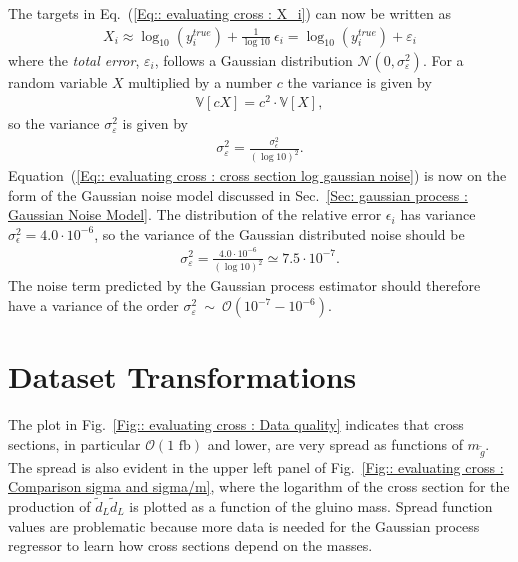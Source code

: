 \documentclass[twoside,english]{uiofysmaster}
\begin{document}
{{The targets in Eq.~(\ref{Eq:: evaluating cross : X_i}) can now be written as
\begin{align}\label{Eq:: evaluating cross : cross section log gaussian noise}
X_i \approx \log_{10}(y_i^{true}) + \frac{1}{\log 10} ~\epsilon_i = \log_{10}(y_i^{true}) + \varepsilon_i 
\end{align}
where the \textit{total error}, $\varepsilon_i$, follows a Gaussian distribution $\mathcal{N}(0, \sigma_{\varepsilon}^2)$. For a random variable $X$ multiplied by a number $c$ the variance is given by
\begin{align}
\mathbb{V}[c X] = c^2 \cdot \mathbb{V}[X],
\end{align}
so the variance $\sigma_{\varepsilon}^2$ is given by
\begin{align}
\sigma_{\varepsilon}^2 = \frac{\sigma_{\epsilon}^2}{(\log 10)^2}.
\end{align}
Equation~(\ref{Eq:: evaluating cross : cross section log gaussian noise}) is now on the form of the Gaussian noise model discussed in Sec.~\ref{Sec: gaussian process : Gaussian Noise Model}. The distribution of the relative error $\epsilon_i$ has variance $\sigma_{\epsilon}^2 = 4.0 \cdot 10^{-6}$, so the variance of the Gaussian distributed noise should be
\begin{align*}
\sigma_{\varepsilon}^2 =  \frac{4.0 \cdot 10^{-6}}{(\log 10)^2} \simeq 7.5 \cdot 10^{-7}.
\end{align*}
The noise term predicted by the Gaussian process estimator should therefore have a variance of the order $\sigma_{\varepsilon}^2~\sim~\mathcal{O}(10^{-7}- 10^{-6})$.


\section{Dataset Transformations}\label{Sec:: evaluating cross : Dataset Transformations}

The plot in Fig.~\ref{Fig:: evaluating cross : Data quality} indicates that cross sections, in particular $\mathcal{O}(1 \text{ fb})$ and lower, are very spread as functions of $m_{\widetilde{g}}$. The spread is also evident in the upper left panel of Fig.~\ref{Fig:: evaluating cross : Comparison sigma and sigma/m}, where the logarithm of the cross section for the production of $\widetilde{d}_L \widetilde{d}_L$ is plotted as a function of the gluino mass. Spread function values are problematic because more data is needed for the Gaussian process regressor to learn how cross sections depend on the masses. 

}}
\end{document}
